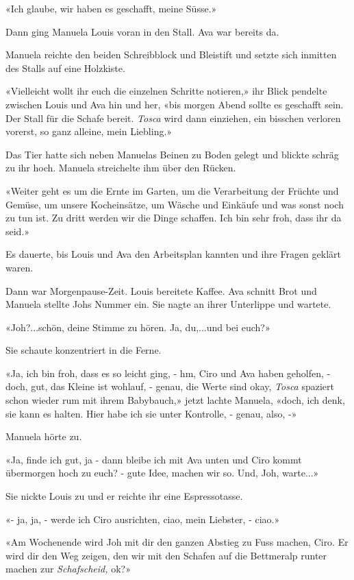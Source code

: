 «Ich glaube, wir haben es geschafft, meine Süsse.»

Dann ging Manuela Louis voran in den Stall. Ava war bereits da.

Manuela reichte den beiden Schreibblock und Bleistift und setzte sich
inmitten des Stalls auf eine Holzkiste.

«Vielleicht wollt ihr euch die einzelnen Schritte notieren,» ihr Blick
pendelte zwischen Louis und Ava hin und her, «bis morgen Abend sollte es
geschafft sein. Der Stall für die Schafe bereit. \emph{Tosca} wird dann
einziehen, ein bisschen verloren vorerst, so ganz alleine, mein
Liebling.»

Das Tier hatte sich neben Manuelas Beinen zu Boden gelegt und blickte
schräg zu ihr hoch. Manuela streichelte ihm über den Rücken.

«Weiter geht es um die Ernte im Garten, um die Verarbeitung der Früchte
und Gemüse, um unsere Kocheinsätze, um Wäsche und Einkäufe und was sonst
noch zu tun ist. Zu dritt werden wir die Dinge schaffen. Ich bin sehr
froh, dass ihr da seid.»

Es dauerte, bis Louis und Ava den Arbeitsplan kannten und ihre Fragen
geklärt waren.

Dann war Morgenpause-Zeit. Louis bereitete Kaffee. Ava schnitt Brot und
Manuela stellte Johs Nummer ein. Sie nagte an ihrer Unterlippe und
wartete.

«Joh?...schön, deine Stimme zu hören. Ja, du,...und bei euch?»

Sie schaute konzentriert in die Ferne.

«Ja, ich bin froh, dass es so leicht ging, - hm, Ciro und Ava haben
geholfen, - doch, gut, das Kleine ist wohlauf, - genau, die Werte sind
okay, \emph{Tosca} spaziert schon wieder rum mit ihrem Babybauch,» jetzt
lachte Manuela, «doch, ich denk, sie kann es halten. Hier habe ich sie
unter Kontrolle, - genau, also, -»

Manuela hörte zu.

«Ja, finde ich gut, ja - dann bleibe ich mit Ava unten und Ciro kommt
übermorgen hoch zu euch? - gute Idee, machen wir so. Und, Joh, warte...»

Sie nickte Louis zu und er reichte ihr eine Espressotasse.

«- ja, ja, - werde ich Ciro ausrichten, ciao, mein Liebster, - ciao.»

«Am Wochenende wird Joh mit dir den ganzen Abstieg zu Fuss machen, Ciro.
Er wird dir den Weg zeigen, den wir mit den Schafen auf die Bettmeralp
runter machen zur \emph{Schafscheid,} ok?»

